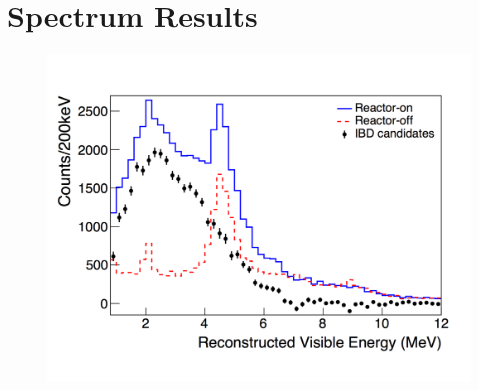 \section{Spectrum Results}
\begin{figure}[H]
	\centering
	\includegraphics[width=0.7\linewidth]{tex/7-oscillation-images/Spectrum}
	\caption{}
	\label{fig:spectrumresults}
\end{figure}



